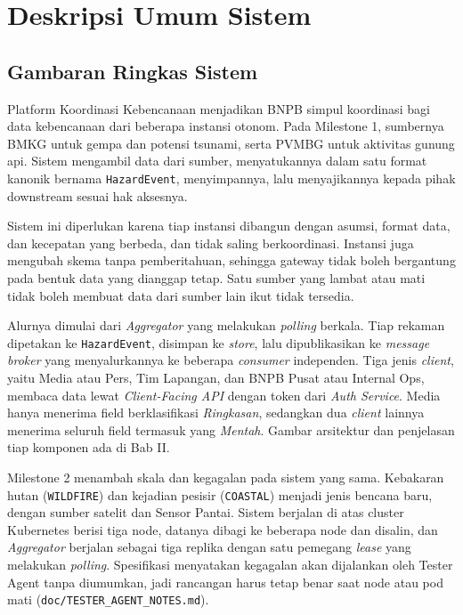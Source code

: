 \chapter{Deskripsi Umum Sistem}

\section{Gambaran Ringkas Sistem}

Platform Koordinasi Kebencanaan menjadikan BNPB simpul koordinasi bagi data kebencanaan dari beberapa instansi otonom. Pada Milestone 1, sumbernya BMKG untuk gempa dan potensi tsunami, serta PVMBG untuk aktivitas gunung api. Sistem mengambil data dari sumber, menyatukannya dalam satu format kanonik bernama \texttt{HazardEvent}, menyimpannya, lalu menyajikannya kepada pihak downstream sesuai hak aksesnya.

Sistem ini diperlukan karena tiap instansi dibangun dengan asumsi, format data, dan kecepatan yang berbeda, dan tidak saling berkoordinasi. Instansi juga mengubah skema tanpa pemberitahuan, sehingga gateway tidak boleh bergantung pada bentuk data yang dianggap tetap. Satu sumber yang lambat atau mati tidak boleh membuat data dari sumber lain ikut tidak tersedia.

Alurnya dimulai dari \textit{Aggregator} yang melakukan \textit{polling} berkala. Tiap rekaman dipetakan ke \texttt{HazardEvent}, disimpan ke \textit{store}, lalu dipublikasikan ke \textit{message broker} yang menyalurkannya ke beberapa \textit{consumer} independen. Tiga jenis \textit{client}, yaitu Media atau Pers, Tim Lapangan, dan BNPB Pusat atau Internal Ops, membaca data lewat \textit{Client-Facing API} dengan token dari \textit{Auth Service}. Media hanya menerima field berklasifikasi \textit{Ringkasan}, sedangkan dua \textit{client} lainnya menerima seluruh field termasuk yang \textit{Mentah}. Gambar arsitektur dan penjelasan tiap komponen ada di Bab II.

Milestone 2 menambah skala dan kegagalan pada sistem yang sama. Kebakaran hutan (\texttt{WILDFIRE}) dan kejadian pesisir (\texttt{COASTAL}) menjadi jenis bencana baru, dengan sumber satelit dan Sensor Pantai. Sistem berjalan di atas cluster Kubernetes berisi tiga node, datanya dibagi ke beberapa node dan disalin, dan \textit{Aggregator} berjalan sebagai tiga replika dengan satu pemegang \textit{lease} yang melakukan \textit{polling}. Spesifikasi menyatakan kegagalan akan dijalankan oleh Tester Agent tanpa diumumkan, jadi rancangan harus tetap benar saat node atau pod mati (\texttt{doc/TESTER\_AGENT\_NOTES.md}).


